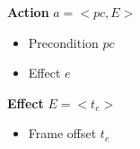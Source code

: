\documentclass{beamer}
\newenvironment{framesubsec}{
    \begin{frame}{\subsecname}
}{\end{frame}}
\begin{document}
\begin{framesubsec}
    \begin{block}{\textbf{Action} $a = <pc,E>$}
        \begin{itemize}
            \item Precondition $pc$
            \item Effect $e$
        \end{itemize}
    \end{block}

    \begin{block}{\textbf{Effect} $E = <t_e>$}
        \begin{itemize}
            \item Frame offset $t_e$
        \end{itemize}
    \end{block}
\end{framesubsec}
\end{document}
